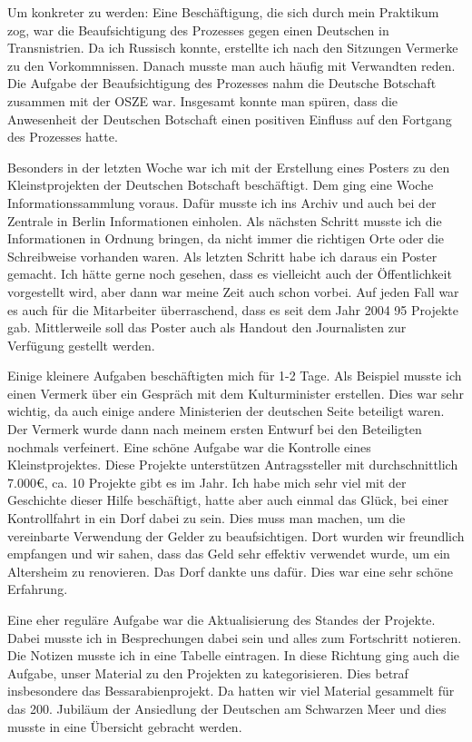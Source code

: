 \documentclass[12pt,a4paper, headsepline]{scrartcl}
\begin{document}
Um konkreter zu werden: Eine Beschäftigung, die sich durch mein Praktikum zog, war die Beaufsichtigung des Prozesses gegen einen Deutschen in Transnistrien. Da ich Russisch konnte, erstellte ich nach den Sitzungen Vermerke zu den Vorkommnissen. Danach musste man auch häufig mit Verwandten reden. Die Aufgabe der Beaufsichtigung des Prozesses nahm die Deutsche Botschaft zusammen mit der OSZE war. Insgesamt konnte man spüren, dass die Anwesenheit der Deutschen Botschaft einen positiven Einfluss auf den Fortgang des Prozesses hatte.

Besonders in der letzten Woche war ich mit der Erstellung eines Posters zu den Kleinstprojekten der Deutschen Botschaft beschäftigt. Dem ging eine Woche Informationssammlung voraus. Dafür musste ich ins Archiv und auch bei der Zentrale in Berlin Informationen einholen. Als nächsten Schritt musste ich die Informationen in Ordnung bringen, da nicht immer die richtigen Orte oder die Schreibweise vorhanden waren. Als letzten Schritt habe ich daraus ein Poster gemacht. Ich hätte gerne noch gesehen, dass es vielleicht auch der Öffentlichkeit vorgestellt wird, aber dann war meine Zeit auch schon vorbei. Auf jeden Fall war es auch für die Mitarbeiter überraschend, dass es seit dem Jahr 2004 95 Projekte gab. Mittlerweile soll das Poster auch als Handout den Journalisten zur Verfügung gestellt werden.

Einige kleinere Aufgaben beschäftigten mich für 1-2 Tage. Als Beispiel musste ich einen Vermerk über ein Gespräch mit dem Kulturminister erstellen. Dies war sehr wichtig, da auch einige andere Ministerien der deutschen Seite beteiligt waren. Der Vermerk wurde dann nach meinem ersten Entwurf bei den Beteiligten nochmals verfeinert.
Eine schöne Aufgabe war die Kontrolle eines Kleinstprojektes. Diese Projekte unterstützen Antragssteller mit durchschnittlich 7.000\euro , ca. 10 Projekte gibt es im Jahr. Ich habe mich sehr viel mit der Geschichte dieser Hilfe beschäftigt, hatte aber auch einmal das Glück, bei einer Kontrollfahrt in ein Dorf dabei zu sein. Dies muss man machen, um die vereinbarte Verwendung der Gelder zu beaufsichtigen. Dort wurden wir freundlich empfangen und wir sahen, dass das Geld sehr effektiv verwendet wurde, um ein Altersheim zu renovieren. Das Dorf dankte uns dafür. Dies war eine sehr schöne Erfahrung.

Eine eher reguläre Aufgabe war die Aktualisierung des Standes der Projekte. Dabei musste ich in Besprechungen dabei sein und alles zum Fortschritt notieren. Die Notizen musste ich in eine Tabelle eintragen. In diese Richtung ging auch die Aufgabe, unser Material zu den Projekten zu kategorisieren. Dies betraf insbesondere das Bessarabienprojekt. Da hatten wir viel Material gesammelt für das 200. Jubiläum der Ansiedlung der Deutschen am Schwarzen Meer und dies musste in eine Übersicht gebracht werden.
\end{document}
